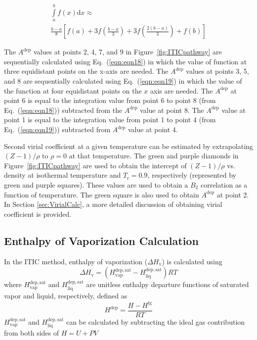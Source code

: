 \documentclass[5p,times]{elsarticle}
\begin{document}
\begin{equation}
\begin{array}{l}
{\int\limits_a^b f(x)\mathrm{d}x \approx }
\\ 
{{\frac{{b - a}}{8} \left[ {f(a) + 3f \left( \frac{{b - a}}{3} \right) + 3f \left( \frac{{2(b - a)}}{3} \right) + f(b)} \right]}}  
\end{array}
\label{eqn:eqn19}
\end{equation}

The $A^{\mathrm{dep}}$ values at points 2, 4, 7, and 9 in Figure~\ref{fig:ITICpathway} are sequentially calculated using Eq.~(\ref{eqn:eqn18}) in which the value of function at three equidistant points on the x-axis are needed. The $A^{\mathrm{dep}}$ values at points 3, 5, and 8 are sequentially calculated using Eq.~(\ref{eqn:eqn19}) in which the value of the function at four equidistant points on the $x$ axis are needed. The $A^{\mathrm{dep}}$ at point 6 is equal to the integration value from point 6 to point 8 (from Eq.~(\ref{eqn:eqn18})) subtracted from the $A^{\mathrm{dep}}$ value at point 8. The $A^{\mathrm{dep}}$ value at point 1 is equal to the integration value from point 1 to point 4 (from Eq.~(\ref{eqn:eqn19})) subtracted from $A^{\mathrm{dep}}$ value at point 4. 

Second virial coefficient at a given temperature can be estimated by extrapolating $(Z-1)/\rho$ to $\rho=0$ at that temperature. The green and purple diamonds in Figure~\ref{fig:ITICpathway} are used to obtain the intercept of $(Z-1)/\rho$ vs. density at isothermal temperature and $T_{\mathrm{r}}=0.9$, respectively (represented by green and purple squares). These values are used to obtain a $B_2$ correlation as a function of temperature. The green square is also used to obtain $A^\mathrm{dep}$ at point 2. In Section \ref{sec:VirialCalc}, a more detailed discussion of obtaining virial coefficient is provided.

\subsection{Enthalpy of Vaporization Calculation}\label{sec:HvapCalc}
In the ITIC method, enthalpy of vaporization ($\Delta H_\mathrm{v}$) is calculated using
\begin{equation}
\Delta H_\mathrm{v}= ( H^{\mathrm{dep,sat}}_\mathrm{vap} - H^{\mathrm{dep,sat}}_\mathrm{liq})RT
\label{eqn:Hvap}
\end{equation}
where $H^{\mathrm{dep,sat}}_\mathrm{vap}$ and $H^{\mathrm{dep,sat}}_\mathrm{liq}$ are unitless enthalpy departure functions of saturated vapor and liquid, respectively, defined as
\begin{equation}
H^{\mathrm{dep}}=\frac{H-H^{\mathrm{ig}}}{RT}
\label{hdep}
\end{equation}
$H^{\mathrm{dep,sat}}_\mathrm{vap}$ and $H^{\mathrm{dep,sat}}_\mathrm{liq}$  can be calculated by subtracting the ideal gas contribution from both sides of $H=U+PV$
\end{document}
